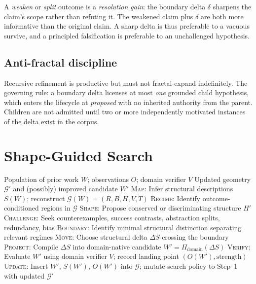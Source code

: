 \documentclass[11pt]{article}
\theoremstyle{gowthm}
\theoremstyle{gowplain}
\begin{document}
A \emph{weaken} or \emph{split} outcome is a \emph{resolution gain}: the
boundary delta $\delta$ sharpens the claim's scope rather than refuting it.
The weakened claim plus $\delta$ are both more informative than the original
claim. A sharp delta is thus preferable to a vacuous survive, and a principled
falsification is preferable to an unchallenged hypothesis.

\subsection{Anti-fractal discipline}

Recursive refinement is productive but must not fractal-expand indefinitely.
The governing rule: a boundary delta licenses at most \emph{one} grounded
child hypothesis, which enters the lifecycle at \emph{proposed} with no
inherited authority from the parent. Children are not admitted until two or
more independently motivated instances of the delta exist in the corpus.

\section{Shape-Guided Search}
\label{sec:method}

\begin{algorithm}[t]
\caption{Shape-Guided Search: \textsc{Map $\to$ Boundary $\to$ Move $\to$
  Project $\to$ Measure}}
\label{alg:gow}
\begin{algorithmic}[1]
\Require Population of prior work $W$; observations $O$; domain verifier $V$
\Ensure Updated geometry $\mathcal{G}'$ and (possibly) improved candidate $W'$
\Statex
\State \textsc{Map}: Infer structural descriptions $S(W)$; reconstruct
  $\mathcal{G}(W) = (R, B, H, V, T)$
\State \textsc{Regime}: Identify outcome-conditioned regions in $\mathcal{G}$
\State \textsc{Shape}: Propose conserved or discriminating structure $H'$
\State \textsc{Challenge}: Seek counterexamples, success contrasts,
  abstraction splits, redundancy, bias
\State \textsc{Boundary}: Identify minimal structural distinction separating
  relevant regimes
\State \textsc{Move}: Choose structural delta $\Delta S$ crossing the boundary
\State \textsc{Project}: Compile $\Delta S$ into domain-native candidate
  $W' = \Pi_{\text{domain}}(\Delta S)$
\State \textsc{Verify}: Evaluate $W'$ using domain verifier $V$; record
  landing point $(O(W'), \text{strength})$
\State \textsc{Update}: Insert $W'$, $S(W')$, $O(W')$ into $\mathcal{G}$;
  mutate search policy
\State \Return to Step~1 with updated $\mathcal{G}'$
\end{algorithmic}
\end{algorithm}
\end{document}
